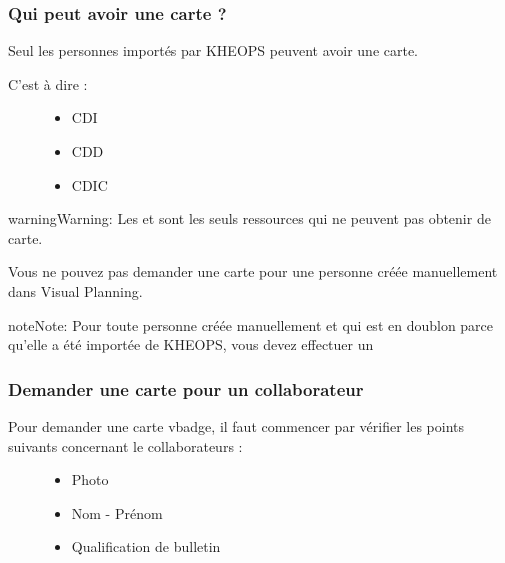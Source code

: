 \documentclass[letterpaper,10pt,english]{sphinxmanual}
\begin{document}
\subsubsection{Qui peut avoir une carte ?}
\label{\detokenize{fonctionnalitees/vbadge:qui-peut-avoir-une-carte}}
Seul les personnes importés par KHEOPS peuvent avoir une carte.
\begin{description}
\item[{C’est à dire :}] \leavevmode\begin{itemize}
\item {} 
CDI

\item {} 
CDD

\item {} 
CDIC

\end{itemize}

\end{description}

\begin{sphinxadmonition}{warning}{Warning:}
Les  et  sont les seuls ressources qui ne peuvent pas obtenir de carte.

Vous ne pouvez pas demander une carte pour une personne créée manuellement dans Visual Planning.
\end{sphinxadmonition}

\begin{sphinxadmonition}{note}{Note:}
Pour toute personne créée manuellement et qui est en doublon parce qu’elle a été importée de KHEOPS, vous devez effectuer un {\hyperref[\detokenize{fonctionnalitees/vbadge:rapprochement}]{}}
\end{sphinxadmonition}


\subsubsection{Demander une carte pour un collaborateur}
\label{\detokenize{fonctionnalitees/vbadge:demander-une-carte-pour-un-collaborateur}}\begin{description}
\item[{Pour demander une carte vbadge, il faut commencer par vérifier les points suivants concernant le collaborateurs :}] \leavevmode\begin{itemize}
\item {} 
Photo

\item {} 
Nom - Prénom

\item {} 
Qualification de bulletin

\end{itemize}

\end{description}
\end{document}
